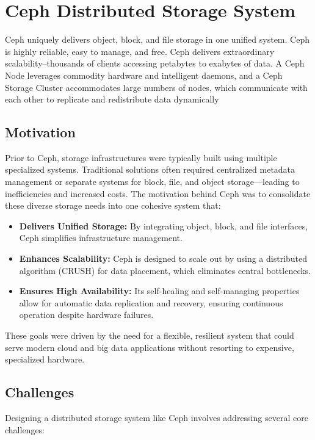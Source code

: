 \chapter{Ceph Distributed Storage System}\label{chap:ceph} 
Ceph uniquely delivers object, block, and file storage in one unified system. Ceph is highly reliable, easy to manage, and free. Ceph delivers extraordinary scalability–thousands of clients accessing petabytes to exabytes of data. A Ceph Node leverages commodity hardware and intelligent daemons, and a Ceph Storage Cluster accommodates large numbers of nodes, which communicate with each other to replicate and redistribute data dynamically

\section{Motivation}\label{sec:ceph_motivation}
 Prior to Ceph, storage infrastructures were typically built using multiple specialized systems. Traditional solutions often required centralized metadata management or separate systems for block, file, and object storage—leading to inefficiencies and increased costs. The motivation behind Ceph was to consolidate these diverse storage needs into one cohesive system that:
\begin{itemize}
    \item \textbf{Delivers Unified Storage:} By integrating object, block, and file interfaces, Ceph simplifies infrastructure management.
    \item \textbf{Enhances Scalability:} Ceph is designed to scale out by using a distributed algorithm (CRUSH) for data placement, which eliminates central bottlenecks. 
    \item \textbf{Ensures High Availability:} Its self-healing and self-managing properties allow for automatic data replication and recovery, ensuring continuous operation despite hardware failures.
\end{itemize}
These goals were driven by the need for a flexible, resilient system that could serve modern cloud and big data applications without resorting to expensive, specialized hardware. \cite{cloudification2024} 

\section{Challenges}\label{sec:ceph_challenges}
Designing a distributed storage system like Ceph involves addressing several core challenges: 


